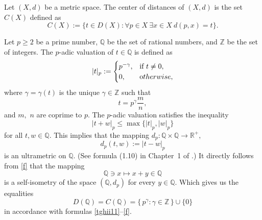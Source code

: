 \documentclass{article}
\begin{document}


\begin{Definition}\label{zcgh572}
Let $(X,d)$ be a metric space.
The center of distances of $(X,d)$ is the set $C(X)$
 defined as
\begin{equation}
    \label{edft34Gb}
C(X):=\{t \in D(X) : \forall p\in X\ \exists x\in X\ d(p,x)=t\}.
\end{equation}
\end{Definition}














\begin{Example}\label{ex1}
Let $p \geq 2$ be a prime number, $\mathbb Q$ be the set of rational numbers, and $\mathbb Z$ be the set of integers. The $p$-adic valuation of $t \in \mathbb{Q}$ is defined as
\begin{equation}\label{hh1}
|t|_p :=
\begin{cases}
p^{-\gamma}, & \text{if } t \neq 0, \\
0, & {\text otherwise},
\end{cases}
\end{equation}
where $\gamma=\gamma(t)$ is the unique $\gamma \in \mathbb{Z}$ such that
\[
t=p^\gamma \frac{m}{n},
\]
and $m,$ $n$ are coprime to $p$.
The $p$-adic valuation satisfies the inequality
\begin{equation*}
|t+w|_p \leq \max\{|t|_p,|w|_p\}
\end{equation*}
for all $t,w \in \mathbb{Q}$.
This implies that the mapping
\(
d_p : \mathbb{Q} \times \mathbb{Q} \to \mathbb{R}^+, \)
\begin{equation}
    \label{f}
d_p(t,w) := |t-w|_p
\end{equation}
is an ultrametric on $\mathbb{Q}$. (See formula (1.10) in Chapter~1 of \cite{Bachman1964}.)
It directly follows from \eqref{f} that the mapping
\[
{\mathbb Q} \ni x \mapsto x+y \in {\mathbb Q}
\]
is a self-isometry of the space $({\mathbb Q}, d_p)$ for every $y\in \mathbb Q$. Which gives us the equalities
\begin{equation}
    \label{ff1}
D(\mathbb{Q}) = C(\mathbb{Q}) = \{\, p^\gamma : \gamma \in \mathbb{Z} \,\} \cup \{0\}
\end{equation}
in accordance with formulas \eqref{tghii11}--\eqref{f}.
\end{Example}
\end{document}
